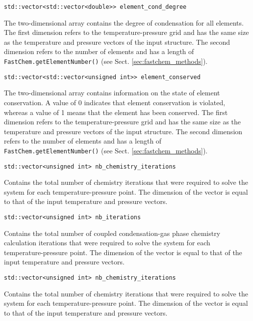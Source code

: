 \documentclass[numbers=noenddot]{aux/fcmanual}
\begin{document}
\bigbreak

\lstinline!std::vector<std::vector<double>> element_cond_degree!
\begin{addmargin}[25pt]{0pt}
	The two-dimensional array contains the degree of condensation for all elements. The first dimension refers to the temperature-pressure grid and has the same size as the temperature and pressure vectors of the input structure. The second dimension refers to the number of elements and has a length of \lstinline!FastChem.getElementNumber()! (see Sect. \ref{sec:fastchem_methods}).
\end{addmargin}

\bigbreak

\lstinline!std::vector<std::vector<unsigned int>> element_conserved!
\begin{addmargin}[25pt]{0pt}
  The two-dimensional array contains information on the state of element conservation. A value of 0 indicates that element conservation is violated, whereas a value of 1 means that the element has been conserved. The first dimension refers to the temperature-pressure grid and has the same size as the temperature and pressure vectors of the input structure. The second dimension refers to the number of elements and has a length of \lstinline!FastChem.getElementNumber()! (see Sect. \ref{sec:fastchem_methods}).
\end{addmargin}

\bigbreak

\lstinline!std::vector<unsigned int> nb_chemistry_iterations!
\begin{addmargin}[25pt]{0pt}
  Contains the total number of chemistry iterations that were required to solve the system for each temperature-pressure point. The dimension of the vector is equal to that of the input temperature and pressure vectors.
\end{addmargin}

\bigbreak

\lstinline!std::vector<unsigned int> nb_iterations!
\begin{addmargin}[25pt]{0pt}
	Contains the total number of coupled condensation-gas phase chemistry calculation iterations that were required to solve the system for each temperature-pressure point. The dimension of the vector is equal to that of the input temperature and pressure vectors.
\end{addmargin}

\bigbreak

\lstinline!std::vector<unsigned int> nb_chemistry_iterations!
\begin{addmargin}[25pt]{0pt}
	Contains the total number of chemistry iterations that were required to solve the system for each temperature-pressure point. The dimension of the vector is equal to that of the input temperature and pressure vectors.
\end{addmargin}
\end{document}
